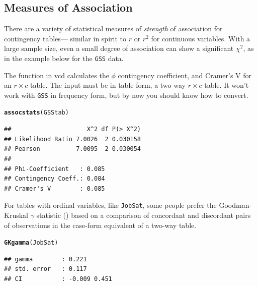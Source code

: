 \documentclass[10pt,twoside]{article}\usepackage[]{graphicx}\usepackage[]{color}
\makeatletter
\newcommand{\hlstd}[1]{\textcolor[rgb]{0.345,0.345,0.345}{#1}}%
\newcommand{\hlkwd}[1]{\textcolor[rgb]{0.737,0.353,0.396}{\textbf{#1}}}%
\newenvironment{kframe}{%
 \def\at@end@of@kframe{}%
 \ifinner\ifhmode%
  \def\at@end@of@kframe{\end{minipage}}%
  \begin{minipage}{\columnwidth}%
 \fi\fi%
 \def\FrameCommand##1{\hskip\@totalleftmargin \hskip-\fboxsep
 \colorbox{shadecolor}{##1}\hskip-\fboxsep
     \hskip-\linewidth \hskip-\@totalleftmargin \hskip\columnwidth}%
 \MakeFramed {\advance\hsize-\width
   \@totalleftmargin\z@ \linewidth\hsize
   \@setminipage}}%
 {\par\unskip\endMakeFramed%
 \at@end@of@kframe}
\newenvironment{knitrout}{}{} %
\newcommand{\data}[1]{\texttt{#1}}
\newcommand{\codefun}[1]{\code{#1()}}
\newcommand{\pkg}[1]{{\normalfont\fontseries{b}\selectfont #1}}
\makeatother
\begin{document}
\subsection{Measures of Association}

There are a variety of statistical measures of \emph{strength} of association for
contingency tables--- similar in spirit to $r$ or $r^2$ for continuous variables.
With a large sample size, even a small degree of association can show a 
significant $\chi^2$, as in the example below for the \data{GSS} data.

The  \codefun{assocstats}  function in \pkg{vcd}  calculates  the   $\phi$
contingency coefficient,  and Cramer's  V for  an $r \times c$  table. 
The input must be in table form, a two-way $r \times c$ table.  
It won't work with \data{GSS} in frequency form, but by now you should know how
to convert.
\begin{knitrout}
\color{fgcolor}\begin{kframe}
\begin{alltt}
\hlkwd{assocstats}\hlstd{(GSStab)}
\end{alltt}
\begin{verbatim}
##                     X^2 df P(> X^2)
## Likelihood Ratio 7.0026  2 0.030158
## Pearson          7.0095  2 0.030054
## 
## Phi-Coefficient   : 0.085 
## Contingency Coeff.: 0.084 
## Cramer's V        : 0.085
\end{verbatim}
\end{kframe}
\end{knitrout}


For tables with ordinal variables, like \data{JobSat}, some people prefer the
Goodman-Kruskal $\gamma$ statistic (\citet[\S 2.4.3]{vcd:Agresti:2002})
based on a comparison of concordant
and discordant pairs of observations in the case-form equivalent of a two-way table.
\begin{knitrout}
\color{fgcolor}\begin{kframe}
\begin{alltt}
\hlkwd{GKgamma}\hlstd{(JobSat)}
\end{alltt}
\begin{verbatim}
## gamma        : 0.221 
## std. error   : 0.117 
## CI           : -0.009 0.451
\end{verbatim}
\end{kframe}
\end{knitrout}
\end{document}
